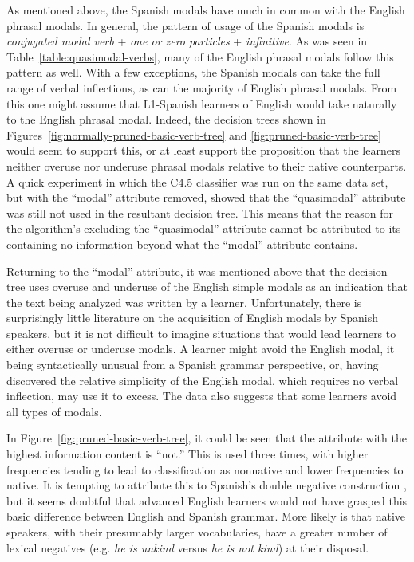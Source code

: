 \documentclass[main.tex]{subfiles}
\begin{document}
As mentioned above, the Spanish modals have much in common with the English phrasal modals. In general, the pattern of usage of the Spanish modals is \textit{conjugated modal verb} + \textit{one or zero particles} + \textit{infinitive}. As was seen in Table~\ref{table:quasimodal-verbs}, many of the English phrasal modals follow this pattern as well. With a few exceptions, the Spanish modals can take the full range of verbal inflections, as can the majority of English phrasal modals. From this one might assume that L1-Spanish learners of English would take naturally to the English phrasal modal. Indeed, the decision trees shown in Figures~\ref{fig:normally-pruned-basic-verb-tree} and \ref{fig:pruned-basic-verb-tree} would seem to support this, or at least support the proposition that the learners neither overuse nor underuse phrasal modals relative to their native counterparts. A quick experiment in which the C4.5 classifier was run on the same data set, but with the ``modal'' attribute removed, showed that the ``quasimodal'' attribute was still not used in the resultant decision tree. This means that the reason for the algorithm's excluding the ``quasimodal'' attribute cannot be attributed to its containing no information beyond what the ``modal'' attribute contains.

Returning to the ``modal'' attribute, it was mentioned above that the decision tree uses overuse and underuse of the English simple modals as an indication that the text being analyzed was written by a learner. Unfortunately, there is surprisingly little literature on the acquisition of English modals by Spanish speakers, but it is not difficult to imagine situations that would lead learners to either overuse or underuse modals. A learner might avoid the English modal, it being syntactically unusual from a Spanish grammar perspective, or, having discovered the relative simplicity of the English modal, which requires no verbal inflection, may use it to excess. The data also suggests that some learners avoid all types of modals.

In Figure~\ref{fig:pruned-basic-verb-tree}, it could be seen that the attribute with the highest information content is ``not.'' This is used three times, with higher frequencies tending to lead to classification as nonnative and lower frequencies to native. It is tempting to attribute this to Spanish's double negative construction \citep[ch. 23.3]{butt}, but it seems doubtful that advanced English learners would not have grasped this basic difference between English and Spanish grammar. More likely is that native speakers, with their presumably larger vocabularies, have a greater number of lexical negatives (e.g. \textit{he is unkind} versus \textit{he is not kind}) at their disposal.
\end{document}
